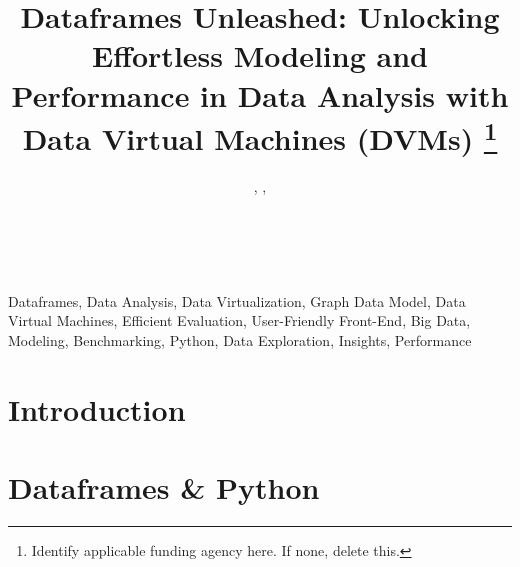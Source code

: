 \documentclass[journal]{IEEEtran} %
\begin{document}
\title{Dataframes Unleashed: Unlocking Effortless Modeling and Performance in Data Analysis with Data Virtual Machines (DVMs)
\thanks{Identify applicable funding agency here. If none, delete this.}
}

\author{%
    , %
    , %
    \\%
    \\%
    \\%
}

\maketitle

\begin{abstract}



\end{abstract}

\begin{IEEEkeywords}
    Dataframes, Data Analysis, Data Virtualization, Graph Data Model, Data Virtual Machines, Efficient Evaluation, User-Friendly Front-End, Big Data, Modeling, Benchmarking, Python, Data Exploration, Insights, Performance
\end{IEEEkeywords}

\section{Introduction}



\section{Dataframes \& Python}
\end{document}
